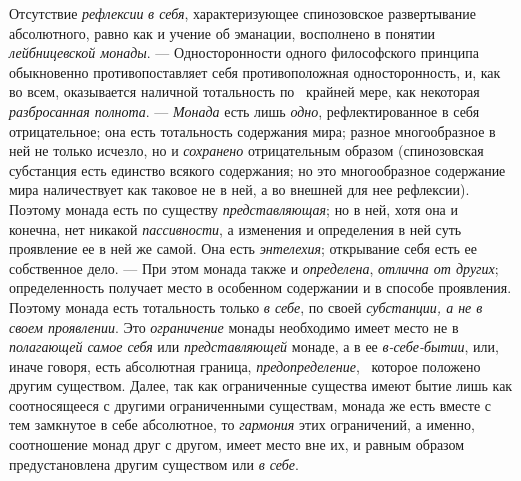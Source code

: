 Отсутствие {\em рефлексии} {\em в
себя}, характеризующее спинозовское развертывание абсолютного, равно как и
учение об эманации, восполнено в понятии
{\em лейбницевской монады}. — Односторонности одного
философского принципа обыкновенно противопоставляет себя противоположная
односторонность, и, как во всем, оказывается наличной тотальность по
\ крайней мере, как некоторая {\em разбросанная
полнота}. — {\em Монада} есть лишь
{\em одно}, рефлектированное в себя отрицательное; она
есть тотальность содержания мира; разное многообразное в ней не только
исчезло, но и {\em сохранено} отрицательным образом
(спинозовская субстанция есть единство всякого содержания; но это
многообразное содержание мира наличествует как таковое не в ней, а во
внешней для нее рефлексии). Поэтому монада есть по существу
{\em представляющая}; но в ней, хотя она и конечна, нет
никакой {\em пассивности}, а изменения и определения в
ней суть проявление ее в ней же самой. Она есть
{\em энтелехия}; открывание себя есть ее собственное
дело. — При этом монада также и {\em определена},
{\em отлична от других}; определенность получает место
в особенном содержании и в способе проявления. Поэтому монада есть
тотальность только {\em в себе}, по своей
{\em субстанции, а не в своем проявлении}. Это
{\em ограничение} монады необходимо имеет место не в
{\em полагающей самое себя} или
{\em представляющей} монаде, а в ее
{\em в-себе-бытии}, или, иначе говоря, есть абсолютная
граница, {\em предопределение}, \ которое положено
другим существом. Далее, так как ограниченные существа имеют бытие лишь как
соотносящееся с другими ограниченными существам, монада же есть вместе с
тем замкнутое в себе абсолютное, то {\em гармония} этих
ограничений, а именно, соотношение монад друг с другом, имеет место вне их,
и равным образом предустановлена другим существом или
{\em в себе}.

